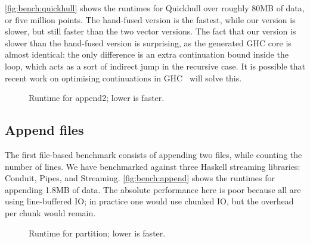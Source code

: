 \autoref{fig:bench:quickhull} shows the runtimes for Quickhull over roughly 80MB of data, or five million points.
The hand-fused version is the fastest, while our version is slower, but still faster than the two vector versions.
The fact that our version is slower than the hand-fused version is surprising, as the generated GHC core is almost identical: the only difference is an extra continuation bound inside the loop, which acts as a sort of indirect jump in the recursive case.
It is possible that recent work on optimising continuations in GHC~\cite{downen2016sequent} will solve this.

\begin{figure}
\caption{Runtime for append2; lower is faster.}
\label{fig:bench:append}
\end{figure}

\subsection{Append files}
The first file-based benchmark consists of appending two files, while counting the number of lines.
We have benchmarked against three Haskell streaming libraries: Conduit, Pipes, and Streaming.
\autoref{fig:bench:append} shows the runtimes for appending 1.8MB of data.
The absolute performance here is poor because all are using line-buffered IO; in practice one would use chunked IO, but the overhead per chunk would remain.


\begin{figure}
\caption{Runtime for partition; lower is faster.}
\label{fig:bench:part}
\end{figure}


